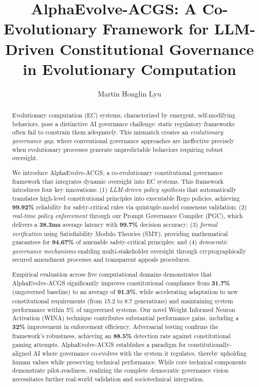 \documentclass[manuscript,screen,9pt]{acmart}
\begin{document}
\title{AlphaEvolve-ACGS: A Co-Evolutionary Framework for LLM-Driven Constitutional Governance in Evolutionary Computation}

\author{Martin Honglin Lyu}

\begin{abstract}
Evolutionary computation (EC) systems, characterized by emergent, self-modifying behaviors, pose a distinctive AI governance challenge: static regulatory frameworks often fail to constrain them adequately. This mismatch creates an \textit{evolutionary governance gap}, where conventional governance approaches are ineffective precisely when evolutionary processes generate unpredictable behaviors requiring robust oversight.

We introduce AlphaEvolve-ACGS, a co-evolutionary constitutional governance framework that integrates dynamic oversight into EC systems. This framework introduces four key innovations: (1) \textit{LLM-driven policy synthesis} that automatically translates high-level constitutional principles into executable Rego policies, achieving \textbf{99.92\%} reliability for safety-critical rules via quintuple-model consensus validation; (2) \textit{real-time policy enforcement} through our Prompt Governance Compiler (PGC), which delivers a \textbf{38.3ms} average latency with \textbf{99.7\%} decision accuracy; (3) \textit{formal verification} using Satisfiability Modulo Theories (SMT), providing mathematical guarantees for \textbf{94.67\%} of amenable safety-critical principles; and (4) \textit{democratic governance mechanisms} enabling multi-stakeholder oversight through cryptographically secured amendment processes and transparent appeals procedures.

Empirical evaluation across five computational domains demonstrates that AlphaEvolve-ACGS significantly improves constitutional compliance from \textbf{31.7\%} (ungoverned baseline) to an average of \textbf{91.3\%}, while accelerating adaptation to new constitutional requirements (from 15.2 to 8.7 generations) and maintaining system performance within 5\% of ungoverned systems. Our novel Weight Informed Neuron Activation (WINA) technique contributes substantial performance gains, including a \textbf{32\%} improvement in enforcement efficiency. Adversarial testing confirms the framework's robustness, achieving an \textbf{88.5\%} detection rate against constitutional gaming attempts. AlphaEvolve-ACGS establishes a paradigm for constitutionally-aligned AI where governance co-evolves with the system it regulates, thereby upholding human values while preserving technical performance. While core technical components demonstrate pilot-readiness, realizing the complete democratic governance vision necessitates further real-world validation and sociotechnical integration.
\end{abstract}
\end{document}
